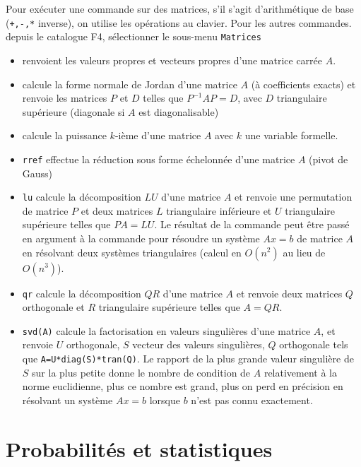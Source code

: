 \documentclass{article}
\begin{document}
\begin{giacjshere}
Pour ex\'ecuter une commande sur des matrices, s'il s'agit
d'arithm\'etique de base (\verb|+,-,*| inverse), on utilise
les op\'erations au clavier. Pour les autres commandes.
depuis le catalogue F4, s\'electionner le sous-menu \verb|Matrices|
\begin{itemize}
\item {}
renvoient les valeurs
propres et vecteurs propres d'une matrice carr\'ee $A$. 
\item {} 
calcule la forme normale de Jordan d'une matrice $A$
(\`a coefficients exacts) et renvoie les matrices $P$ et $D$ telles que
$P^{-1}AP=D$, avec $D$ triangulaire sup\'erieure (diagonale si $A$ est
diagonalisable)
\item {} calcule la puissance $k$-i\`eme
d'une matrice $A$ avec $k$ une variable formelle.
\item \verb|rref| effectue la r\'eduction sous forme \'echelonn\'ee
d'une matrice $A$ (pivot de Gauss)
\item \verb|lu| calcule la d\'ecomposition $LU$ d'une matrice $A$
et renvoie une permutation de matrice $P$ et deux matrices $L$
triangulaire inf\'erieure et $U$ triangulaire sup\'erieure telles que
$PA=LU$. Le r\'esultat de la commande 
 peut
\^etre pass\'e en argument \`a la commande 
pour r\'esoudre un syst\`eme $Ax=b$ de matrice $A$ en r\'esolvant
deux syst\`emes triangulaires (calcul en $O(n^2)$ au lieu
de $O(n^3)$).
\item \verb|qr| calcule la d\'ecomposition $QR$ d'une matrice $A$
et renvoie deux matrices $Q$ orthogonale et $R$ triangulaire sup\'erieure
telles que $A=QR$.
\item \verb|svd(A)| calcule la factorisation en valeurs
singuli\`eres d'une matrice $A$, et renvoie 
$U$ orthogonale, $S$ vecteur des valeurs singulières, $Q$
orthogonale tels que \verb|A=U*diag(S)*tran(Q)|. Le rapport
de la plus grande valeur singuli\`ere de $S$ sur la plus petite
donne le nombre de condition de $A$ relativement \`a la norme euclidienne,
plus ce nombre est grand, plus on perd en pr\'ecision en r\'esolvant
un syst\`eme $Ax=b$ lorsque $b$ n'est pas connu exactement.
\end{itemize}


\section{Probabilit\'es et statistiques}


\end{giacjshere}
\end{document}
